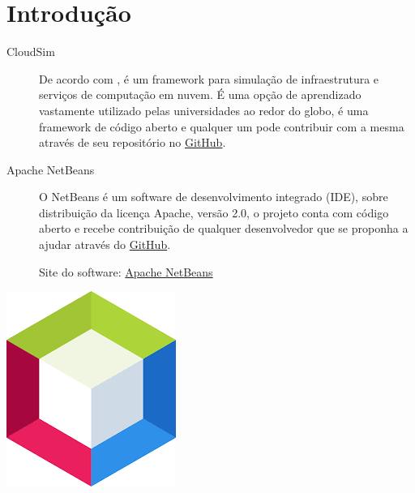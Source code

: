 
\section{Introdução}




\noindent \begin{minipage}[c]{0.6\textwidth}
  \vspace {1cm}
  \begin{description}
    \item [CloudSim] De acordo com , é um framework para simulação de infraestrutura e serviços de computação em nuvem.
    É uma opção de aprendizado vastamente utilizado pelas universidades ao redor do globo, é uma framework de código aberto e qualquer um pode contribuir com a mesma através de seu repositório no \href{https://github.com/Cloudslab}{GitHub}.
    \item [Apache NetBeans]  O NetBeans é um software de desenvolvimento integrado (IDE), sobre distribuição da licença Apache, versão 2.0, o projeto conta com código aberto e recebe contribuição de qualquer desenvolvedor que se proponha a ajudar através do \href{https://github.com/apache/netbeans-website/blob/master/netbeans.apache.org/src/content/index.adoc}{GitHub}.
\newline
    \par Site do software: \href{https://netbeans.apache.org/}{Apache NetBeans}
  \end{description}

\end{minipage}
\begin{minipage}[c]{0.4\textwidth}

  \includegraphics[width=\textwidth]{figure/netBeana.png}
  	\label{fig:netBeans}
\end{minipage}

